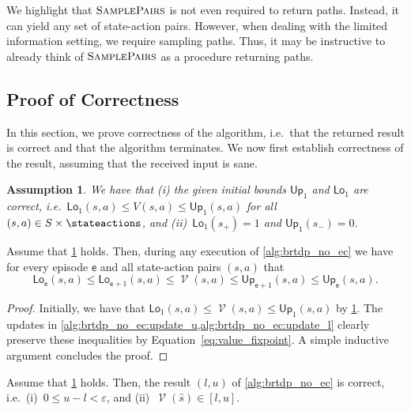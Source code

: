 \documentclass{theoretics}
\newcommand{\States}{S}
\newcommand{\initialstate}{\hat{s}}
\DeclareMathOperator{\val}{\mathcal{V}}
\newcommand{\upperbound}{\mathsf{Up}}
\newcommand{\lowerbound}{\mathsf{Lo}}
\newcommand{\targetstate}{s_+}
\newcommand{\sinkstate}{s_-}
\newcommand{\samplepath}{\textsc{SamplePairs}}
\newcommand{\algoepisode}{\mathsf{e}}
\newtheorem{assumption}{Assumption}
\begin{document}
\begin{remark} \label{rem:brtdp_no_ec:sample_pair}
	We highlight that $\samplepath$ is not even required to return paths.
	Instead, it can yield any set of state-action pairs.
	However, when dealing with the limited information setting, we require sampling paths.
	Thus, it may be instructive to already think of $\samplepath$ as a procedure returning paths.
\end{remark}

\subsection{Proof of Correctness}

In this section, we prove correctness of the algorithm, i.e.\ that the returned result is correct and that the algorithm terminates.
We now first establish correctness of the result, assuming that the received input is sane.
\begin{assumption} \label{asm:brtdp_no_ec:input_correct}
	We have that (i) the given initial bounds $\upperbound_1$ and $\lowerbound_1$ are correct, i.e.\ $\lowerbound_1(s, a) \leq V(s, a) \leq \upperbound_1(s, a)$ for all $(s, a) \in \States \times \stateactions$, and (ii)~$\lowerbound_1(\targetstate) = 1$ and $\upperbound_1(\sinkstate) = 0$.
\end{assumption}
\begin{lemma} \label{stm:brtdp:no_ec:bounds_correct}
	Assume that \cref{asm:brtdp_no_ec:input_correct} holds.
	Then, during any execution of \cref{alg:brtdp_no_ec} we have for every episode $\algoepisode$ and all state-action pairs $(s, a)$ that
	\begin{equation*}
		\lowerbound_\algoepisode(s, a) \leq \lowerbound_{\algoepisode + 1}(s, a) \leq \val(s, a) \leq \upperbound_{\algoepisode + 1}(s, a) \leq \upperbound_\algoepisode(s, a).
	\end{equation*}
\end{lemma}
\begin{proof}
	Initially, we have that $\lowerbound_1(s, a) \leq \val(s, a) \leq \upperbound_1(s, a)$ by \cref{asm:brtdp_no_ec:input_correct}.
	The updates in \cref{alg:brtdp_no_ec:update_u,alg:brtdp_no_ec:update_l} clearly preserve these inequalities by Equation~\eqref{eq:value_fixpoint}.
	A simple inductive argument concludes the proof. 
\end{proof}

\begin{lemma} \label{stm:brtdp:no_ec:correct}
	Assume that \cref{asm:brtdp_no_ec:input_correct} holds.
	Then, the result $(l, u)$ of \cref{alg:brtdp_no_ec} is correct, i.e.\ (i)~$0 \leq u - l < \varepsilon$, and (ii)~$\val(\initialstate) \in [l, u]$.
\end{lemma}
\end{document}
